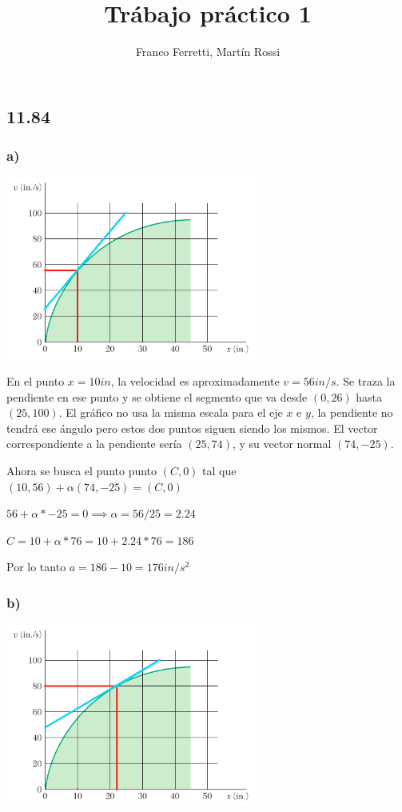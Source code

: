 \documentclass[12pt]{article}
\title{\LARGE \textbf{Trábajo práctico 1}}
\author{Franco Ferretti, Martín Rossi}
\date{}
\begin{document}
\maketitle
\subsection*{11.84}
\subsubsection*{a)}
\includegraphics[width=320px]{1184a}

En el punto $x=10in$, la velocidad es aproximadamente $v=56in/s$. Se traza la pendiente en ese punto y se obtiene el segmento que va desde $(0,26)$ hasta $(25,100)$. El gráfico no usa la misma escala para el eje $x$ e $y$, la pendiente no tendrá ese ángulo pero estos dos puntos siguen siendo los mismos. El vector correspondiente a la pendiente sería $(25,74)$, y su vector normal $(74,-25)$.

Ahora se busca el punto punto $(C,0)$ tal que $(10,56)+\alpha(74,-25)=(C,0)$

$56+\alpha*-25=0 \implies \alpha=56/25=2.24$

$C=10+\alpha*76=10+2.24*76=186$

Por lo tanto $a=186-10=176in/s^2$
\subsubsection*{b)}
\includegraphics[width=320px]{1184b}
\end{document}
